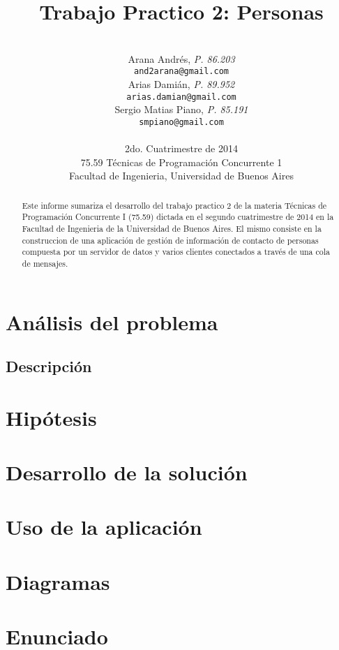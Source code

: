 \documentclass[a4paper,10pt]{article}
\title{\textbf{Trabajo Practico 2: Personas}}
\author{\\
  Arana Andrés, \textit{P. 86.203}                                 \\
  \texttt{and2arana@gmail.com}                                     \\ [2.5ex]
  Arias Damián, \textit{P. 89.952}                                 \\
  \texttt{arias.damian@gmail.com}                                  \\ [2.5ex]
  Sergio Matias Piano, \textit{P. 85.191}                          \\
  \texttt{smpiano@gmail.com}                                       \\ [2.5ex]
                                                                   \\
  \normalsize{2do. Cuatrimestre de 2014}                           \\
  \normalsize{75.59 Técnicas de Programación Concurrente 1}        \\
  \normalsize{Facultad de Ingenieria, Universidad de Buenos Aires} \\
}
\date{}
\begin{document}
\thispagestyle{empty}
\maketitle

\begin{abstract}

  Este informe sumariza el desarrollo del trabajo practico 2 de la materia
  Técnicas de Programación Concurrente I (75.59) dictada en el segundo
  cuatrimestre de 2014 en la Facultad de Ingenieria de la Universidad de Buenos
  Aires. El mismo consiste en la construccion de una aplicación de gestión de
  información de contacto de personas compuesta por un servidor de datos y
  varios clientes conectados a través de una cola de mensajes.

\end{abstract}

\clearpage

\tableofcontents
\clearpage




\section{Análisis del problema}

\subsection{Descripción}

\section{Hipótesis}

\clearpage
\section{Desarrollo de la solución}

\clearpage
\section{Uso de la aplicación}

\clearpage
\section{Diagramas}

\clearpage
\section{Enunciado}

\end{document}
